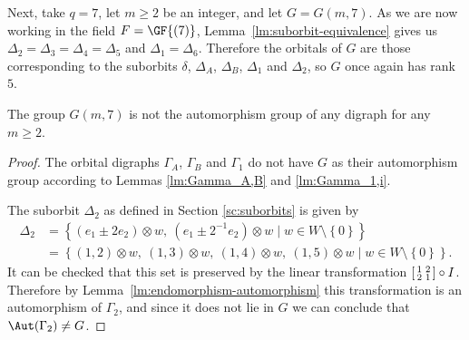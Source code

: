 Next, take $q=7$, let $m \geqslant 2$ be an integer, and let $G = G{\left(m, 7 \right)}$. As we are now working in the field $F = \GF {\left(7 \right)}$, Lemma~\ref{lm:suborbit-equivalence} gives us $\Delta_2 = \Delta_3 = \Delta_4 = \Delta_5$ and $\Delta_1 = \Delta_6$. Therefore the orbitals of $G$ are those corresponding to the suborbits $\delta$, $\Delta_A$, $\Delta_B$, $\Delta_1$ and $\Delta_2$, so $G$ once again has rank $5$.

\begin{theorem} \label{thm:q=7}
The group $G{\left(m, 7 \right)}$ is not the automorphism group of any digraph for any $m \geqslant 2$.
\end{theorem}
\begin{proof}
The orbital digraphs $\Gamma_A$, $\Gamma_B$ and $\Gamma_1$ do not have $G$ as their automorphism group according to Lemmas \ref{lm:Gamma_A,B} and \ref{lm:Gamma_1,i}.

The suborbit $\Delta_2$ as defined in Section \ref{sc:suborbits} is given by
\begin{align*}
\Delta_2 &= \left\{\left(e_1 \pm 2 e_2 \right) \otimes w,\ \left(e_1 \pm 2^{-1} e_2 \right) \otimes w \mid w \in W \setminus \left\{0 \right\}\right\} \\
&= \left\{\left(1, 2 \right) \otimes w,\ \left(1, 3 \right) \otimes w,\ \left(1, 4 \right) \otimes w,\ \left(1, 5 \right) \otimes w \mid w \in W \setminus \left\{0 \right\}\right\}.
\end{align*}
It can be checked that this set is preserved by the linear transformation $\begin{bsmallmatrix} 1 & 2 \\ 2 & 1 \end{bsmallmatrix} \circ I$. Therefore by Lemma~\ref{lm:endomorphism-automorphism} this transformation is an automorphism of $\Gamma_2$, and since it does not lie in $G$ we can conclude that $\Aut(\Gamma_2) \neq G$.


\end{proof}
